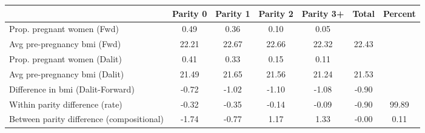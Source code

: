 \begin{tabular}{l*{6}{c}}
\toprule
            &\multicolumn{1}{c}{Parity 0}&\multicolumn{1}{c}{Parity 1}&\multicolumn{1}{c}{Parity 2}&\multicolumn{1}{c}{Parity 3+}&\multicolumn{1}{c}{Total}&\multicolumn{1}{c}{Percent}\\
\midrule
\midrule
Prop. pregnant women (Fwd)&        0.49&        0.36&        0.10&        0.05&            &            \\
Avg pre-pregnancy bmi (Fwd)&       22.21&       22.67&       22.66&       22.32&       22.43&            \\
Prop. pregnant women (Dalit)&        0.41&        0.33&        0.15&        0.11&            &            \\
Avg pre-pregnancy bmi (Dalit)&       21.49&       21.65&       21.56&       21.24&       21.53&            \\
Difference in bmi (Dalit-Forward)&       -0.72&       -1.02&       -1.10&       -1.08&       -0.90&            \\
Within parity difference (rate)&       -0.32&       -0.35&       -0.14&       -0.09&       -0.90&       99.89\\
Between parity difference (compositional)&       -1.74&       -0.77&        1.17&        1.33&       -0.00&        0.11\\
\bottomrule
\end{tabular}
